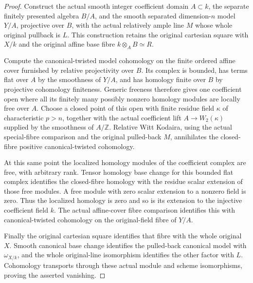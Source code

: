 \begin{proof}
Construct the actual smooth integer coefficient domain
$A\subset k$, the separate finitely presented algebra $B/A$,
and the smooth separated dimension-$n$ model $Y/A$, projective
over $B$, with the actual relatively ample line $M$ whose whole
original pullback is $L$.  This construction retains the
original cartesian square with $X/k$ and the original affine
base fibre $k\otimes_A B\simeq R$.

Compute the canonical-twisted model cohomology on the finite
ordered affine cover furnished by relative projectivity over
$B$.  Its complex is bounded, has terms flat over $A$ by the
smoothness of $Y/A$, and has homology finite over $B$ by
projective cohomology finiteness.  Generic freeness therefore
gives one coefficient open where all its finitely many
possibly nonzero homology modules are locally free over $A$.
Choose a closed point of this open with finite residue field
$\kappa$ of characteristic $p>n$, together with the actual
coefficient lift $A\to W_2(\kappa)$ supplied by the smoothness
of $A/\mathbb Z$.  Relative Witt Kodaira, using the actual
special-fibre comparison and the original pulled-back $M$,
annihilates the closed-fibre positive canonical-twisted
cohomology.

At this same point the localized homology modules of the
coefficient complex are free, with arbitrary rank.  Tensor
homology base change for this bounded flat complex identifies
the closed-fibre homology with the residue scalar extension
of those free modules.  A free module with zero scalar
extension to a nonzero field is zero.  Thus the localized
homology is zero and so is its extension to the injective
coefficient field $k$.  The actual affine-cover fibre
comparison identifies this with canonical-twisted cohomology
on the original-field fibre of $Y/A$.

Finally the original cartesian square identifies that fibre
with the whole original $X$.  Smooth canonical base change
identifies the pulled-back canonical model with
$\omega_{X/k}$, and the whole original-line isomorphism
identifies the other factor with $L$.  Cohomology transports
through these actual module and scheme isomorphisms, proving
the asserted vanishing.
\end{proof}
